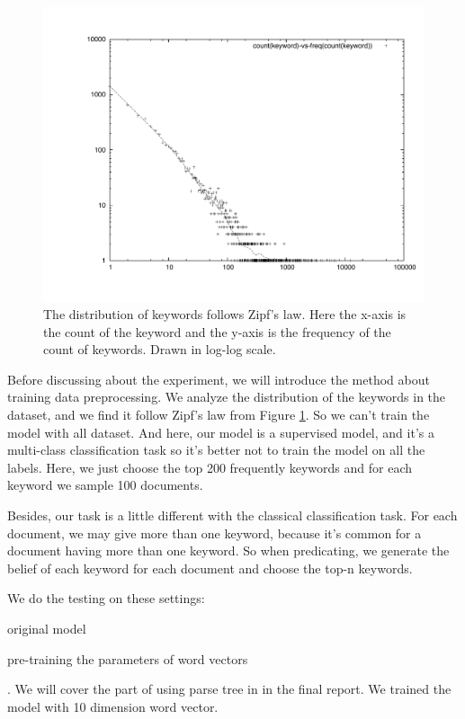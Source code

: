 \documentclass[dvips,9pt]{article}
\begin{document}
         \begin{figure}
         \includegraphics[scale=0.5]{dist.pdf}
         \caption{The distribution of keywords follows Zipf's law. Here the x-axis is the count of the keyword and the y-axis is the frequency of the count of keywords. Drawn in log-log scale.}
         \label{zips}
        \end{figure}
        
        Before discussing about the experiment, we will introduce the method about training data preprocessing. We analyze the distribution of the keywords in the dataset, and we find it follow Zipf's law from Figure \ref{zips}. So we can't train the model with all dataset. And here, our model is a supervised model, and it's a multi-class classification task so it's better not to train the model on all the labels. Here, we just choose the top 200 frequently keywords and for each keyword we sample 100 documents.
        
        Besides, our task is a little different with the classical classification task. For each document, we may give more than one keyword, because it's common for a document having more than one keyword. So when predicating, we generate the belief of each keyword for each document and choose the top-n keywords.
        
        We do the testing on these settings:\begin{inparaenum}[(i)]
            \item original model
            \item pre-training the parameters of word vectors
        \end{inparaenum}. We will cover the part of using parse tree in in the final report. We trained the model with 10 dimension word vector.
        
\end{document}
